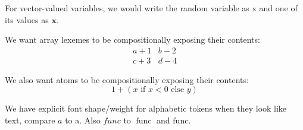 For vector-valued variables, we would write the random variable as $\bm{\mathrm{x}}$ and one of its values as $\bm{x}$.


We want array lexemes to be compositionally exposing their contents:
\[ \begin{array}{cc} a+1 & b-2 \\ c+3 & d-4 \end{array} \]

We also want atoms to be compositionally exposing their contents:
\[ 1+\left( \text{$x$ if $x<0$ else $y$} \right) \]


\DeclareMathOperator{\func}{func}
We have explicit font shape/weight for alphabetic tokens when they look like text, compare $a$ to $\mathrm{a}$.
Also $\mathit{func}$ to $\func$ and $\mathrm{func}$.